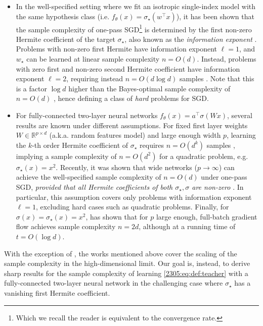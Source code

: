 \begin{itemize}
    \item In the well-specified setting where we fit an isotropic single-index model with the same hypothesis class (i.e. $f_{\theta}(x) = \sigma_{\star}(w^{\top}x)$), it has been shown that the sample complexity of one-pass SGD\footnote{Which we recall the reader is equivalent to the convergence rate.}  is determined by the first non-zero Hermite coefficient of the target $\sigma_{\star}$, also known as the \emph{information exponent} \citep{arous2021online}. Problems with non-zero first Hermite have information exponent $\ell=1$, and $w_{\star}$ can be learned at linear sample complexity $n=O(d)$. Instead, problems with zero first and non-zero second Hermite coefficient have information exponent $\ell=2$, requiring instead $n = O(d\log{d})$ samples \citep{tan2019online,arous2021online}. Note that this is a factor $\log{d}$ higher than the Bayes-optimal sample complexity of $n=O(d)$ \citep{barbier2019optimal,maillard2020phase}, hence defining a class of \emph{hard} problems for SGD. 
    \item For fully-connected two-layer neural networks $f_{\theta}(x) = a^{\top}\sigma(Wx)$, several results are known under different assumptions. For fixed first layer weights $W\in\mathbb{R}^{p\times d}$ (a.k.a. random features model) and large enough width $p$, learning the $k$-th order Hermite coefficient of $\sigma_{\star}$ requires $n=O(d^{k})$ samples \citep{mei2022generalizationerror}, implying a sample complexity of $n=O(d^2)$ for a quadratic problem, e.g. $\sigma_{\star}(x)=x^2$. Recently, it was shown that wide networks ($p\to\infty$) can achieve the well-specified sample complexity of $n=O(d)$ under one-pass SGD, \emph{provided that all Hermite coefficients of both $\sigma_{\star}, \sigma$ are non-zero} \citep{berthier2023learning}. In particular, this assumption covers only problems with information exponent $\ell=1$, excluding hard cases such as quadratic problems. Finally, for $\sigma(x) = \sigma_{\star}(x) = x^2$, \cite{saraomannelli2020optimization} has shown that for $p$  large enough, full-batch gradient flow achieves sample complexity $n=2d$, although at a running time of $t=O(\log{d})$. 
\end{itemize}
With the exception of \cite{berthier2023learning}, the works mentioned above cover the scaling of the sample complexity in the high-dimensional limit. Our goal is, instead, to derive sharp results for the sample complexity of learning \eqref{2305:eq:def:teacher} with a fully-connected two-layer neural network in the challenging case where $\sigma_{\star}$ has a vanishing first Hermite coefficient.
